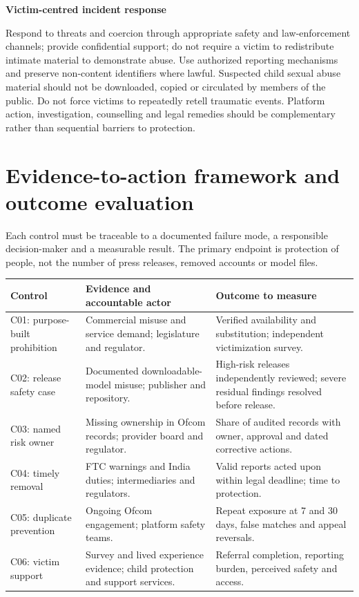 \documentclass[10pt,a4paper]{article}
\newcommand{\sub}[1]{\vspace{1mm}\textbf{#1}\par}
\begin{document}
\sub{Victim-centred incident response}
Respond to threats and coercion through appropriate safety and law-enforcement channels; provide confidential support; do not require a victim to redistribute intimate material to demonstrate abuse. Use authorized reporting mechanisms and preserve non-content identifiers where lawful. Suspected child sexual abuse material should not be downloaded, copied or circulated by members of the public. Do not force victims to repeatedly retell traumatic events. Platform action, investigation, counselling and legal remedies should be complementary rather than sequential barriers to protection.


\section{Evidence-to-action framework and outcome evaluation}
Each control must be traceable to a documented failure mode, a responsible decision-maker and a measurable result. The primary endpoint is protection of people, not the number of press releases, removed accounts or model files.
\begin{center}\small\begin{tabularx}{\linewidth}{@{}>{\RaggedRight\arraybackslash}p{.18\linewidth}YY@{}}\toprule
\textbf{Control} & \textbf{Evidence and accountable actor} & \textbf{Outcome to measure}\\\midrule
C01: purpose-built prohibition & Commercial misuse and service demand; legislature and regulator. \cite{isdtraffic,apps29,ausbill} & Verified availability and substitution; independent victimization survey.\\
C02: release safety case & Documented downloadable-model misuse; publisher and repository. \cite{ausmodels,ntia} & High-risk releases independently reviewed; severe residual findings resolved before release.\\
C03: named risk owner & Missing ownership in Ofcom records; provider board and regulator. \cite{ofcomrisk} & Share of audited records with owner, approval and dated corrective actions.\\
C04: timely removal & FTC warnings and India duties; intermediaries and regulators. \cite{ftcletters,indiafull} & Valid reports acted upon within legal deadline; time to protection.\\
C05: duplicate prevention & Ongoing Ofcom engagement; platform safety teams. \cite{ofcomncii} & Repeat exposure at 7 and 30 days, false matches and appeal reversals.\\
C06: victim support & Survey and lived experience evidence; child protection and support services. \cite{auskids,deepfakeimpact} & Referral completion, reporting burden, perceived safety and access.\\\bottomrule\end{tabularx}\end{center}
\end{document}
